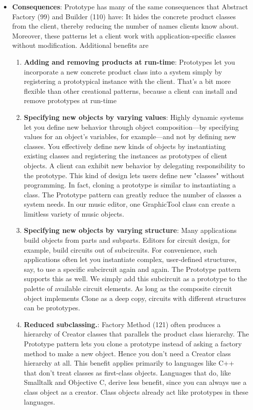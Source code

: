 \documentclass{report}
\begin{document}
\begin{itemize}
\begin{itemize}
            \end{itemize}
        \item \textbf{Consequences}: Prototype has many of the same consequences that Abstract Factory (99) and Builder (110) have: It hides the concrete product classes from the client, thereby reducing the number of names clients know about. Moreover, these patterns let a client work with application-specific classes without modification.
            \bigbreak \noindent 
            Additional benefits are
            \begin{enumerate}
                \item \textbf{Adding and removing products at run-time}: Prototypes let you incorporate a new concrete product class into a system simply by registering a prototypical instance with the client. That's a bit more flexible than other creational patterns, because a client can install and remove prototypes at run-time
                \item \textbf{Specifying new objects by varying values}: Highly dynamic systems let you define new behavior through object composition—by specifying values for an object's variables, for example—and not by defining new classes. You effectively define new kinds of objects by instantiating existing classes and registering the instances as prototypes of client objects. A client can exhibit new behavior by delegating responsibility to the prototype.
                    \bigbreak \noindent 
                    This kind of design lets users define new "classes" without programming. In fact, cloning a prototype is similar to instantiating a class. The Prototype pattern can greatly reduce the number of classes a system needs. In our music editor, one GraphicTool class can create a limitless variety of music objects.
                \item \textbf{Specifying new objects by varying structure}: Many applications build objects from parts and subparts. Editors for circuit design, for example, build circuits out of subcircuits. For convenience, such applications often let you instantiate complex, user-defined structures, say, to use a specific subcircuit again and again.
                    \bigbreak \noindent 
                    The Prototype pattern supports this as well. We simply add this subcircuit as a prototype to the palette of available circuit elements. As long as the composite circuit object implements Clone as a deep copy, circuits with different structures can be prototypes.
                \item \textbf{Reduced subclassing.}: Factory Method (121) often produces a hierarchy of Creator classes that parallels the product class hierarchy. The Prototype pattern lets you clone a prototype instead of asking a factory method to make a new object. Hence you don't need a Creator class hierarchy at all. This benefit applies primarily to languages like C++ that don't treat classes as first-class objects. Languages that do, like Smalltalk and Objective C, derive less benefit, since you can always use a class object as a creator. Class objects already act like prototypes in these languages.

\end{enumerate}
\end{itemize}
\end{document}
